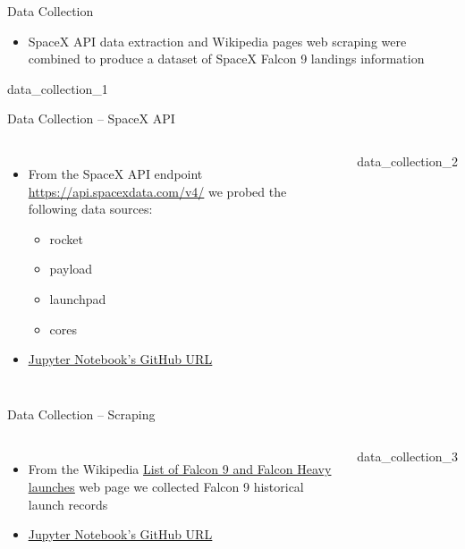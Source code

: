 \begin{frame}{Data Collection}
    \begin{itemize}
        \item SpaceX API data extraction and Wikipedia pages web scraping were combined to produce a dataset of SpaceX Falcon 9 landings information
    \end{itemize}
    {data_collection_1}
\end{frame}

{\nologo
\begin{frame}{Data Collection -- SpaceX API}
    \begin{columns}
            \begin{itemize}
                \item From the SpaceX API endpoint \url{https://api.spacexdata.com/v4/} we probed the following data sources:
                \begin{itemize}
                    \item rocket
                    \item payload
                    \item launchpad
                    \item cores
                \end{itemize}
                \item \href{https://github.com/eyamrog/ibm_data_science/blob/main/10_Data_Science_Capstone_Lab1_Collecting_the_Data.ipynb}{\uline{Jupyter Notebook's GitHub URL}}
            \end{itemize}
            {data_collection_2}
    \end{columns}
\end{frame}
}

{\nologo
\begin{frame}{Data Collection -- Scraping}
    \begin{columns}
            \begin{itemize}
                \item From the Wikipedia \href{https://en.wikipedia.org/wiki/List_of_Falcon_9_and_Falcon_Heavy_launches}{\uline{List of Falcon 9 and Falcon Heavy launches}} web page we collected Falcon 9 historical launch records
                \item \href{https://github.com/eyamrog/ibm_data_science/blob/main/10_Data_Science_Capstone_Web_Scraping.ipynb}{\uline{Jupyter Notebook's GitHub URL}}
            \end{itemize}
            {data_collection_3}
    \end{columns}
\end{frame}
}

